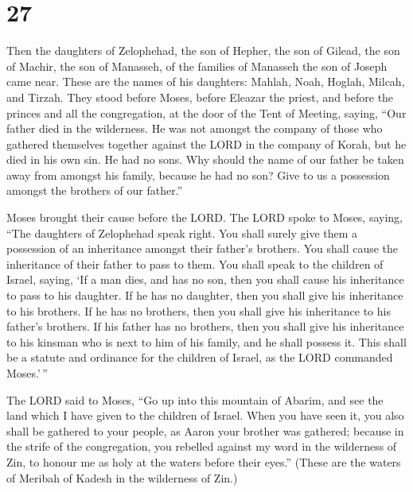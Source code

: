 \hypertarget{section-26}{%
\section{27}\label{section-26}}

 Then the daughters of Zelophehad, the son of Hepher, the
son of Gilead, the son of Machir, the son of Manasseh, of the families
of Manasseh the son of Joseph came near. These are the names of his
daughters: Mahlah, Noah, Hoglah, Milcah, and Tirzah.  They
stood before Moses, before Eleazar the priest, and before the princes
and all the congregation, at the door of the Tent of Meeting, saying,
 ``Our father died in the wilderness. He was not amongst
the company of those who gathered themselves together against the LORD
in the company of Korah, but he died in his own sin. He had no sons.
 Why should the name of our father be taken away from
amongst his family, because he had no son? Give to us a possession
amongst the brothers of our father.''

 Moses brought their cause before the LORD. 
The LORD spoke to Moses, saying,  ``The daughters of
Zelophehad speak right. You shall surely give them a possession of an
inheritance amongst their father's brothers. You shall cause the
inheritance of their father to pass to them.  You shall
speak to the children of Israel, saying, `If a man dies, and has no son,
then you shall cause his inheritance to pass to his daughter.
 If he has no daughter, then you shall give his
inheritance to his brothers.  If he has no brothers, then
you shall give his inheritance to his father's brothers. 
If his father has no brothers, then you shall give his inheritance to
his kinsman who is next to him of his family, and he shall possess it.
This shall be a statute and ordinance for the children of Israel, as the
LORD commanded Moses.'\,''

 The LORD said to Moses, ``Go up into this mountain of
Abarim, and see the land which I have given to the children of Israel.
 When you have seen it, you also shall be gathered to
your people, as Aaron your brother was gathered;  because
in the strife of the congregation, you rebelled against my word in the
wilderness of Zin, to honour me as holy at the waters before their
eyes.'' (These are the waters of Meribah of Kadesh in the wilderness of
Zin.)

